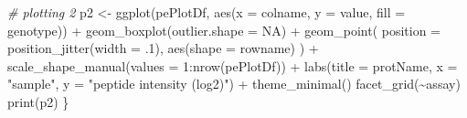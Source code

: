 \documentclass[
]{article}
\newenvironment{Shaded}{\begin{snugshade}}{\end{snugshade}}
\newcommand{\AttributeTok}[1]{\textcolor[rgb]{0.77,0.63,0.00}{#1}}
\newcommand{\CommentTok}[1]{\textcolor[rgb]{0.56,0.35,0.01}{\textit{#1}}}
\newcommand{\ConstantTok}[1]{\textcolor[rgb]{0.00,0.00,0.00}{#1}}
\newcommand{\DecValTok}[1]{\textcolor[rgb]{0.00,0.00,0.81}{#1}}
\newcommand{\FunctionTok}[1]{\textcolor[rgb]{0.00,0.00,0.00}{#1}}
\newcommand{\NormalTok}[1]{#1}
\newcommand{\OtherTok}[1]{\textcolor[rgb]{0.56,0.35,0.01}{#1}}
\newcommand{\SpecialCharTok}[1]{\textcolor[rgb]{0.00,0.00,0.00}{#1}}
\newcommand{\StringTok}[1]{\textcolor[rgb]{0.31,0.60,0.02}{#1}}
\begin{document}
\begin{Shaded}
\begin{Highlighting}[]
        \CommentTok{\# plotting 2}
\NormalTok{        p2 }\OtherTok{\textless{}{-}} \FunctionTok{ggplot}\NormalTok{(pePlotDf, }\FunctionTok{aes}\NormalTok{(}\AttributeTok{x =}\NormalTok{ colname, }\AttributeTok{y =}\NormalTok{ value, }\AttributeTok{fill =}\NormalTok{ genotype)) }\SpecialCharTok{+}
            \FunctionTok{geom\_boxplot}\NormalTok{(}\AttributeTok{outlier.shape =} \ConstantTok{NA}\NormalTok{) }\SpecialCharTok{+}
            \FunctionTok{geom\_point}\NormalTok{(}
                \AttributeTok{position =} \FunctionTok{position\_jitter}\NormalTok{(}\AttributeTok{width =}\NormalTok{ .}\DecValTok{1}\NormalTok{),}
                \FunctionTok{aes}\NormalTok{(}\AttributeTok{shape =}\NormalTok{ rowname)}
\NormalTok{            ) }\SpecialCharTok{+}
            \FunctionTok{scale\_shape\_manual}\NormalTok{(}\AttributeTok{values =} \DecValTok{1}\SpecialCharTok{:}\FunctionTok{nrow}\NormalTok{(pePlotDf)) }\SpecialCharTok{+}
            \FunctionTok{labs}\NormalTok{(}\AttributeTok{title =}\NormalTok{ protName, }\AttributeTok{x =} \StringTok{"sample"}\NormalTok{, }\AttributeTok{y =} \StringTok{"peptide intensity (log2)"}\NormalTok{) }\SpecialCharTok{+}
            \FunctionTok{theme\_minimal}\NormalTok{()}
        \FunctionTok{facet\_grid}\NormalTok{(}\SpecialCharTok{\textasciitilde{}}\NormalTok{assay)}
        \FunctionTok{print}\NormalTok{(p2)}
\NormalTok{\}}
\end{Highlighting}
\end{Shaded}
\end{document}
